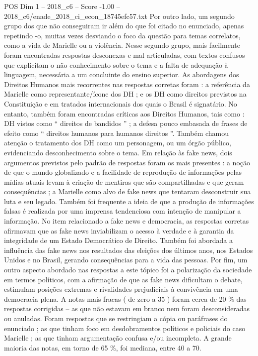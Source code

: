 \begin{textsample}{POS Dim 1 – 2018\_c6 – Score -1.00 – 2018\_c6/enade\_2018\_ci\_econ\_18745efc57.txt}
Por outro lado, um segundo grupo dos que não conseguiram ir além do que foi citado no enunciado, apenas repetindo -o, muitas vezes desviando o foco da questão para temas correlatos, como a vida de Marielle ou a violência.
Nesse segundo grupo, mais facilmente foram encontradas respostas desconexas e mal articuladas, com textos confusos que explicitam o não conhecimento sobre o tema e a falta de adequação à linguagem, necessária a um concluinte do ensino superior.
As abordagens dos Direitos Humanos mais recorrentes nas respostas corretas foram : a referência da Marielle como representante/ícone dos DH ; e os DH como direitos previstos na Constituição e em tratados internacionais dos quais o Brasil é signatário.
No entanto, também foram encontradas críticas aos Direitos Humanos, tais como : DH vistos como “ direitos de bandidos ” ; a defesa pouco embasada de frases de efeito como “ direitos humanos para humanos direitos ”.
Também chamou atenção o tratamento dos DH como um personagem, ou um órgão público, evidenciando desconhecimento sobre o tema.
Em relação às fake news, dois argumentos previstos pelo padrão de respostas foram os mais presentes : a noção de que o mundo globalizado e a facilidade de reprodução de informações pelas mídias atuais levam à criação de mentiras que são compartilhadas e que geram consequências ; a Marielle como alvo de fake news que tentaram desconstruir sua luta e seu legado.
Também foi frequente a ideia de que a produção de informações falsas é realizada por uma imprensa tendenciosa com intenção de manipular a informação.
No item relacionado a fake news e democracia, as respostas corretas afirmavam que as fake news inviabilizam o acesso à verdade e à garantia da integridade de um Estado Democrático de Direito.
Também foi abordada a influência das fake news nos resultados das eleições dos últimos anos, nos Estados Unidos e no Brasil, gerando consequências para a vida das pessoas.
Por fim, um outro aspecto abordado nas respostas a este tópico foi a polarização da sociedade em termos políticos, com a afirmação de que as fake news dificultam o debate, estimulam posições extremas e rivalidades prejudiciais à convivência em uma democracia plena.
A notas mais fracas ( de zero a 35 ) foram cerca de 20 \% das respostas corrigidas – as que não estavam em branco nem foram desconsideradas ou anuladas.
Foram respostas que se restringiam a cópia ou paráfrases do enunciado ; as que tinham foco em desdobramentos políticos e policiais do caso Marielle ; as que tinham argumentação confusa e/ou incompleta.
A grande maioria das notas, em torno de 65 \%, foi mediana, entre 40 a 70.

\end{textsample}
